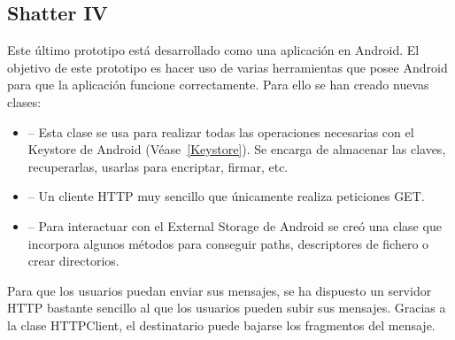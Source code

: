 \subsection{Shatter IV}


Este último prototipo está desarrollado como una aplicación en Android. El
objetivo de este prototipo es hacer uso de varias herramientas que posee Android
para que la aplicación funcione correctamente. Para ello se han creado nuevas
clases:

\begin{itemize}
  \item {} -- Esta clase se usa para realizar todas las
  operaciones necesarias con el Keystore de Android (Véase~\ref{Keystore}). Se
  encarga de almacenar las claves, recuperarlas, usarlas para encriptar,
  firmar, etc.

  \item {} -- Un cliente HTTP muy sencillo que únicamente
  realiza peticiones GET.

  \item {} -- Para interactuar con el External Storage de
  Android se creó una clase que incorpora algunos métodos para conseguir paths,
  descriptores de fichero o crear directorios.
\end{itemize}


Para que los usuarios puedan enviar sus mensajes, se ha dispuesto un servidor
HTTP bastante sencillo al que los usuarios pueden subir sus mensajes. Gracias a
la clase HTTPClient, el destinatario puede bajarse los fragmentos del mensaje.


